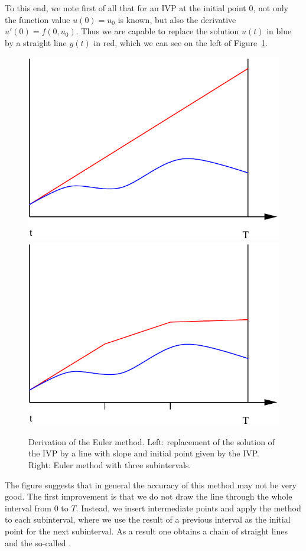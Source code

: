 \begin{example}
  To this end, we note first of all that for an IVP at the initial
  point $0$, not only the function value $u(0) = u_0$ is known,
  but also the derivative $u'(0) = f(0, u_0)$. Thus we are capable
  to replace the solution $u(t)$ in blue by a straight line $y(t)$ in
  red, which we can see on the left of Figure~\ref{fig:explicit:Euler}.
  \begin{figure}[tp]
    \centering
    \includegraphics[width=.48\textwidth]{fig/euler1}
    \includegraphics[width=.48\textwidth]{fig/euler2}
    \caption{Derivation of the Euler method. Left: replacement of the
			solution of the IVP by a line with slope and initial point given 
			by the IVP. Right: Euler method with three subintervals.}
    \label{fig:explicit:Euler}
  \end{figure}
  The figure suggests that in general the accuracy of this method may
  not be very good. The first improvement is that we do not draw the
  line through the whole interval from $0$ to $T$.  Instead, we
  insert intermediate points and apply the method to each subinterval,
  where we use the result of a previous interval as the initial point
  for the next subinterval.  As a result one obtains a
  chain of straight lines and the so-called .
\end{example}




